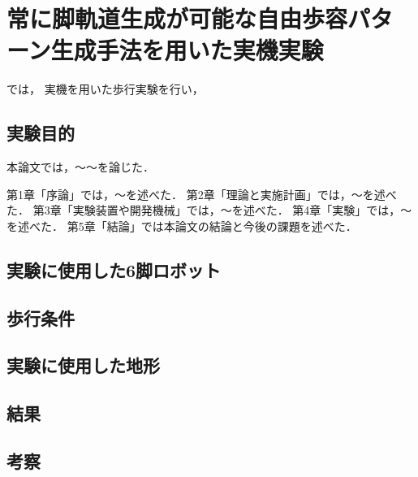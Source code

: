 ﻿%

\chapter{常に脚軌道生成が可能な自由歩容パターン生成手法を用いた実機実験}\label{chapter:常に脚軌道生成が可能な自由歩容パターン生成手法を用いた実機実験}

では，
実機を用いた歩行実験を行い，

\section{実験目的}

本論文では，～～を論じた．

第1章「序論」では，～を述べた．
第2章「理論と実施計画」では，～を述べた．
第3章「実験装置や開発機械」では，～を述べた．
第4章「実験」では，～を述べた．
第5章「結論」では本論文の結論と今後の課題を述べた．

\section{実験に使用した6脚ロボット}


\section{歩行条件}

\section{実験に使用した地形}

\section{結果}

\section{考察}